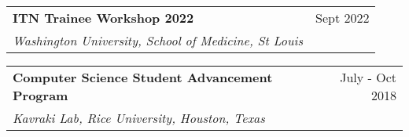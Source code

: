\documentclass[a4paper,12pt]{article}
\begin{document}
\begin{tabularx}{\linewidth}{ @{}l r@{} }
\textbf{ITN Trainee Workshop 2022} & \hfill \qquad \qquad \qquad \qquad \qquad \qquad  \qquad \qquad \quad Sept 2022 \\
\textit{Washington University, School of Medicine, St Louis} & \\[3.75pt]
\end{tabularx}


\begin{tabularx}{\linewidth}{ @{}l r@{} }
\textbf{Computer Science Student Advancement Program} & \hfill \qquad \qquad \qquad \qquad \qquad \qquad  July - Oct 2018 \\
\textit{Kavraki Lab, Rice University, Houston, Texas} & \\[3.75pt]
\end{tabularx}
\end{document}
